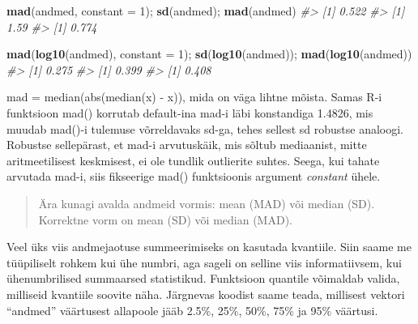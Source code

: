 \documentclass[]{book}
\newenvironment{Shaded}{\begin{snugshade}}{\end{snugshade}}
\newcommand{\KeywordTok}[1]{\textcolor[rgb]{0.13,0.29,0.53}{\textbf{#1}}}
\newcommand{\DataTypeTok}[1]{\textcolor[rgb]{0.13,0.29,0.53}{#1}}
\newcommand{\DecValTok}[1]{\textcolor[rgb]{0.00,0.00,0.81}{#1}}
\newcommand{\FloatTok}[1]{\textcolor[rgb]{0.00,0.00,0.81}{#1}}
\newcommand{\CommentTok}[1]{\textcolor[rgb]{0.56,0.35,0.01}{\textit{#1}}}
\newcommand{\NormalTok}[1]{#1}
\begin{document}
\begin{Shaded}
\begin{Highlighting}[]
\KeywordTok{mad}\NormalTok{(andmed, }\DataTypeTok{constant =} \DecValTok{1}\NormalTok{); }\KeywordTok{sd}\NormalTok{(andmed); }\KeywordTok{mad}\NormalTok{(andmed)}
\CommentTok{#> [1] 0.522}
\CommentTok{#> [1] 1.59}
\CommentTok{#> [1] 0.774}
\end{Highlighting}
\end{Shaded}

\begin{Shaded}
\begin{Highlighting}[]
\KeywordTok{mad}\NormalTok{(}\KeywordTok{log10}\NormalTok{(andmed), }\DataTypeTok{constant =} \DecValTok{1}\NormalTok{); }\KeywordTok{sd}\NormalTok{(}\KeywordTok{log10}\NormalTok{(andmed)); }\KeywordTok{mad}\NormalTok{(}\KeywordTok{log10}\NormalTok{(andmed))}
\CommentTok{#> [1] 0.275}
\CommentTok{#> [1] 0.399}
\CommentTok{#> [1] 0.408}
\end{Highlighting}
\end{Shaded}

mad = median(abs(median(x) - x)), mida on väga lihtne mõista. Samas R-i
funktsioon mad() korrutab default-ina mad-i läbi konstandiga 1.4826, mis
muudab mad()-i tulemuse võrreldavaks sd-ga, tehes sellest sd robustse
analoogi. Robustse sellepärast, et mad-i arvutuskäik, mis sõltub
mediaanist, mitte aritmeetilisest keskmisest, ei ole tundlik outlierite
suhtes. Seega, kui tahate arvutada mad-i, siis fikseerige mad()
funktsioonis argument \emph{constant} ühele.

\begin{quote}
Ära kunagi avalda andmeid vormis: mean (MAD) või median (SD). Korrektne
vorm on mean (SD) või median (MAD).
\end{quote}

Veel üks viis andmejaotuse summeerimiseks on kasutada kvantiile. Siin
saame me tüüpiliselt rohkem kui ühe numbri, aga sageli on selline viis
informatiivsem, kui ühenumbrilised summaarsed statistikud. Funktsioon
quantile võimaldab valida, milliseid kvantiile soovite näha. Järgnevas
koodist saame teada, millisest vektori ``andmed'' väärtusest allapoole
jääb 2.5\%, 25\%, 50\%, 75\% ja 95\% väärtusi.

\begin{Shaded}
\end{Shaded}
\end{document}
